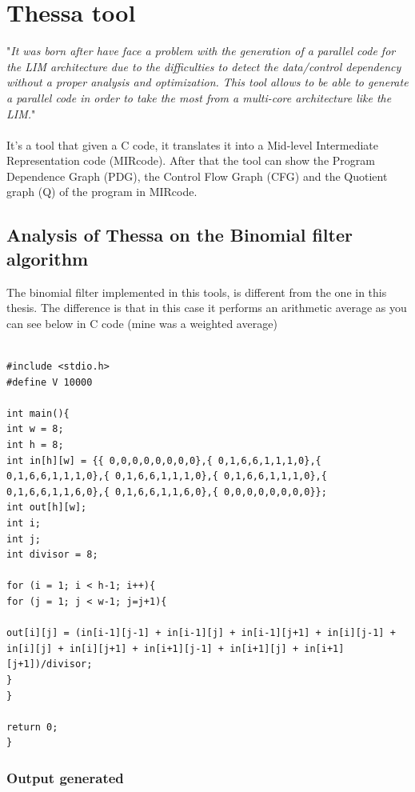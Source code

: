 \chapter{Thessa tool}
{
	"\textit{It was born after have face a problem with the generation of a parallel code for the LIM architecture due to the difficulties to detect the data/control dependency without a proper analysis and optimization. This tool allows to be able to generate a parallel code in order to take the most from a multi-core architecture like the LIM.}"
	\\[5pt]
	 \\
 
 It's a tool that given a C code, it translates it into a Mid-level Intermediate Representation code (MIRcode). After that the tool can show the Program Dependence Graph (PDG), the  Control Flow Graph (CFG) and the Quotient graph (Q) of the program in MIRcode. 
\section{Analysis of Thessa on the Binomial filter algorithm}

The binomial filter implemented in this tools, is different from the one in this thesis.
The difference is that in this case it performs an arithmetic average as you can see below in C code (mine was a weighted average)
\lstset{ %
	language=C,
	basicstyle=\footnotesize,
	numbers=left,
	stepnumber=1,
	showstringspaces=false,
	tabsize=1,
	breaklines=true,
	breakatwhitespace=false,
}

\begin{lstlisting}[frame=single]  % Start your 

#include <stdio.h>
#define V 10000

int main(){
int w = 8;
int h = 8;
int in[h][w] = {{ 0,0,0,0,0,0,0,0},{ 0,1,6,6,1,1,1,0},{ 0,1,6,6,1,1,1,0},{ 0,1,6,6,1,1,1,0},{ 0,1,6,6,1,1,1,0},{ 0,1,6,6,1,1,6,0},{ 0,1,6,6,1,1,6,0},{ 0,0,0,0,0,0,0,0}};
int out[h][w];
int i;
int j;
int divisor = 8;

for (i = 1; i < h-1; i++){
for (j = 1; j < w-1; j=j+1){

out[i][j] = (in[i-1][j-1] + in[i-1][j] + in[i-1][j+1] + in[i][j-1] + in[i][j] + in[i][j+1] + in[i+1][j-1] + in[i+1][j] + in[i+1][j+1])/divisor;
}
}

return 0;
}
\end{lstlisting}
\subsection{Output generated}
}
